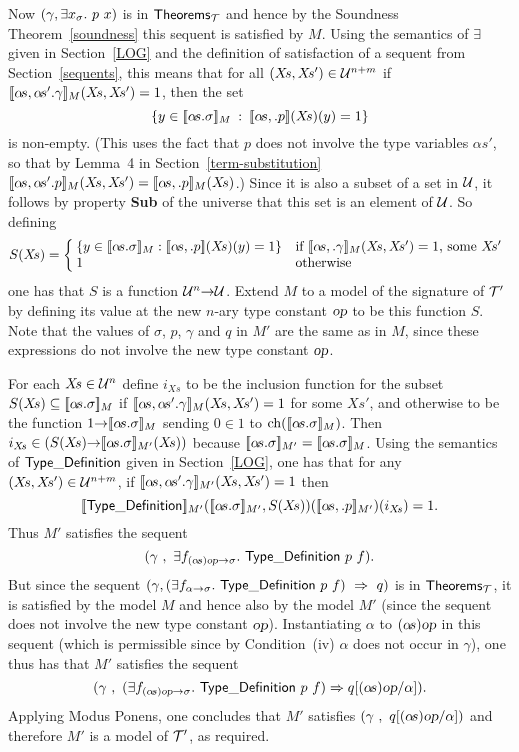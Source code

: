 Now $(\gamma,\exists x_{\sigma}.\ p\ x)$ is in ${\sf Theorems}_{\cal T}$
and hence by the Soundness Theorem~\ref{soundness} this sequent is
satisfied by $M$. Using the semantics of $\exists$ given in
Section~\ref{LOG} and the definition of satisfaction of a sequent from
Section~\ref{sequents}, this means that for all $(X\!s,X\!s')\in{\cal U}^{n+m}$
if $[\![\alpha\!s,\alpha\!s'.\gamma]\!]_M(X\!s,X\!s')=1$, then
the set
\[
\{y\in[\![\alpha\!s.\sigma]\!]_{M}\: :\: [\![\alpha\!s,.p]\!](X\!s)(y)=1\}
\]
is non-empty. (This uses the fact that $p$ does not involve
the type variables $\alpha\!s'$, so that by Lemma~4 in
Section~\ref{term-substitution}
$\den{\alpha\!s,\alpha\!s'.p}_M(X\!s,X\!s')=\den{\alpha\!s,.p}_M(X\!s)$.)
Since it is also a subset of a set in $\cal U$, it
follows by property {\bf Sub} of the universe that this set is an element of
$\cal U$. So defining
\[
S(X\!s) = \left\{\hspace{-1mm}
\begin{array}{ll}
\{y\in\den{\alpha\!s.\sigma}_{M} : \den{\alpha\!s,.p}(X\!s)(y)=1\}
  & \mbox{\rm if $\den{\alpha\!s,.\gamma}_M(X\!s,X\!s')=1$, some $X\!s'$}\\
1 & \mbox{\rm otherwise}
\end{array}
\right.%
\]
one has that $S$ is a function ${\cal U}^n{\to}{\cal U}$.  Extend $M$
to a model of the signature of ${\cal T}'$ by defining its value at
the new $n$-ary type constant $\textsl{op}$ to be this function $S$. Note
that the values of $\sigma$, $p$, $\gamma$ and
$q$ in $M'$ are the same as in $M$, since these expressions do not
involve the new type constant $\textsl{op}$.

For each $X\!s\in{\cal U}^{n}$ define $i_{X\!s}$ to be the inclusion
function for the subset $S(X\!s)\subseteq[\![\alpha\!s.\sigma]\!]_{M}$
if $[\![\alpha\!s,\alpha\!s'.\gamma]\!]_M(X\!s,X\!s')=1$ for some
$X\!s'$, and otherwise to be the function
$1{\to}[\![\alpha\!s.\sigma]\!]_{M}$ sending $0\in 1$ to
$\mbox{\rm ch}([\![\alpha\!s.\sigma]\!]_{M})$. Then
$i_{X\!s}\in(S(X\!s){\to}[\![\alpha\!s.\sigma]\!]_{M'}(X\!s))$ because
$[\![\alpha\!s.\sigma]\!]_{M'}=[\![\alpha\!s.\sigma]\!]_M$. Using the
semantics of ${\sf Type\_Definition}$ given in Section~\ref{LOG}, one has that for any
$(X\!s,X\!s')\in{\cal U}^{n+m}$, if
$[\![\alpha\!s,\alpha\!s'.\gamma]\!]_{M'}(X\!s,X\!s')=1$ then
\[
\den{\TyDef}_{M'}(\den{\alpha\!s.\sigma}_{M'} ,
   S(X\!s))(\den{\alpha\!s,.p}_{M'})(i_{X\!s}) = 1.
\]
Thus $M'$ satisfies the sequent
\[
(\gamma\ ,\ \exists f_{(\alpha\!s)\textsl{op}{\to}\sigma}.\ {\sf Type\_Definition}\ p\ f).
\]
But since the sequent $(\gamma,(\exists f_{\alpha{\to}\sigma}.\ {\sf
Type\_Definition}\ p\ f)\ \Rightarrow\ q )$ is in ${\sf Theorems}_{\cal T}$,
it is satisfied by the model $M$ and hence also by the model $M'$
(since the sequent does not involve the new type constant $\textsl{op}$).
Instantiating $\alpha$ to $(\alpha\!s)\textsl{op}$ in this sequent (which
is permissible since by Condition~(iv) $\alpha$ does not occur in
$\gamma$), one thus has that $M'$ satisfies the sequent
\[
(\gamma\ ,\
(\exists f_{(\alpha\!s)\textsl{op}{\to}\sigma}.\ {\sf Type\_Definition}\ p\ f)\Rightarrow
q[(\alpha\!s)\textsl{op}/\alpha]).
\]
Applying Modus Ponens, one concludes that $M'$ satisfies
$(\gamma\ ,\ q[(\alpha\!s)\textsl{op}/\alpha])$ and
therefore $M'$ is a model of ${\cal T}'$, as required.

